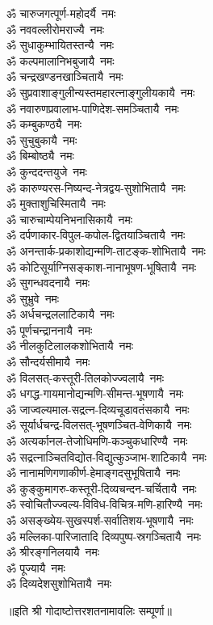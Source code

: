 \begin{multicols}{2}
\begin{flushleft}
ॐ चारुजगत्पूर्ण-महोदर्यै~नमः\\
ॐ नववल्लीरोमराज्यै~नमः\\
ॐ सुधाकुम्भायितस्तन्यै~नमः\\
ॐ कल्पमालानिभबुजायै~नमः\\
ॐ चन्द्रखण्डनखाञ्चितायै~नमः\hfill{}\\
ॐ सुप्रवाशाङ्गुलीन्यस्तमहा\-रत्नाङ्गुलीयकायै~नमः\\
ॐ नवारुणप्रवालाभ-पाणिदेश-समञ्चितायै~नमः\\
ॐ कम्बुकण्ठ्यै~नमः\\
ॐ सुचुबुकायै~नमः\\
ॐ बिम्बोष्ठ्यै~नमः\\
ॐ कुन्ददन्तयुजे~नमः\\
ॐ कारुण्यरस-निष्यन्द-नेत्रद्वय-सुशोभितायै~नमः\\
ॐ मुक्ताशुचिस्मितायै~नमः\\
ॐ चारुचाम्पेयनिभनासिकायै~नमः\\
ॐ दर्पणाकार-विपुल-कपोल-द्वितयाञ्चितायै~नमः\hfill{}\\
ॐ अनन्तार्क-प्रकाशोद्यन्मणि-ताटङ्क-शोभितायै~नमः\\
ॐ कोटिसूर्याग्निसङ्काश-नानाभूषण-भूषितायै~नमः\\
ॐ सुगन्धवदनायै~नमः\\
ॐ सुभ्रुवे~नमः\\
ॐ अर्धचन्द्रललाटिकायै~नमः\\
ॐ पूर्णचन्द्राननायै~नमः\\
ॐ नीलकुटिलालकशोभितायै~नमः\\
ॐ सौन्दर्यसीमायै~नमः\\
ॐ विलसत्-कस्तूरी-तिलकोज्ज्वलायै~नमः\\
ॐ धगद्ध-गायमानोद्यन्मणि-सीमन्त-भूषणायै~नमः\hfill{}\\
ॐ जाज्वल्यमाल-सद्रत्न-दिव्यचूडावतंसकायै~नमः\\
ॐ सूर्यार्धचन्द्र-विलसत्-भूषणञ्चित-वेणिकायै~नमः\\
ॐ अत्यर्कानल-तेजोधिमणि-कञ्चुकधारिण्यै~नमः\\
ॐ सद्रत्नाञ्चितविद्योत-विद्युत्कुञ्जाभ-शाटिकायै~नमः\\
ॐ नानामणिगणाकीर्ण-हेमाङ्गदसुभूषितायै~नमः\\
ॐ कुङ्कुमागरु-कस्तूरी-दिव्यचन्दन-चर्चितायै~नमः\\
ॐ स्वोचितौज्ज्वल्य-विविध-विचित्र-मणि-हारिण्यै~नमः\\
ॐ असङ्ख्येय-सुखस्पर्श-सर्वातिशय-भूषणायै~नमः\\
ॐ मल्लिका-पारिजातादि  दिव्यपुष्प-स्रगञ्चितायै~नमः\\
ॐ श्रीरङ्गनिलयायै~नमः\hfill{}\\
ॐ पूज्यायै~नमः\\
ॐ दिव्यदेशसुशोभितायै~नमः\\
\end{flushleft}
\end{multicols}
\centerline{॥इति श्री गोदाष्टोत्तरशतनामावलिः सम्पूर्णा॥}
